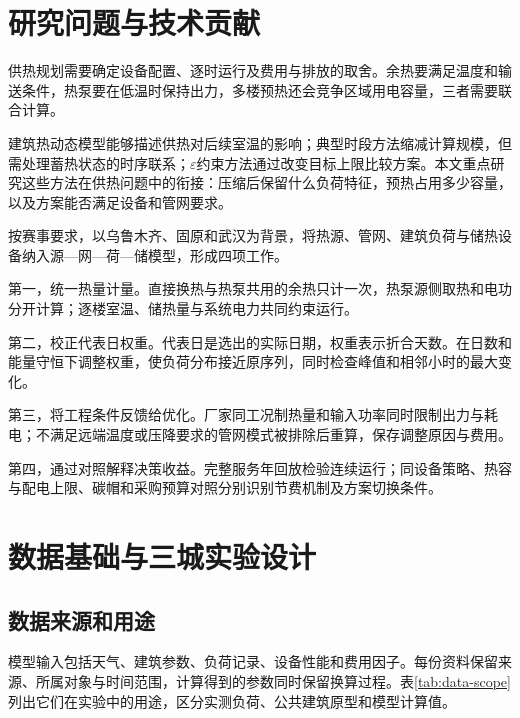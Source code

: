 \section{研究问题与技术贡献}

供热规划需要确定设备配置、逐时运行及费用与排放的取舍。余热要满足温度和输送条件，热泵要在低温时保持出力，多楼预热还会竞争区域用电容量，三者需要联合计算。

建筑热动态模型能够描述供热对后续室温的影响；典型时段方法缩减计算规模，但需处理蓄热状态的时序联系；$\varepsilon$约束方法通过改变目标上限比较方案。本文重点研究这些方法在供热问题中的衔接：压缩后保留什么负荷特征，预热占用多少容量，以及方案能否满足设备和管网要求。

按赛事要求，以乌鲁木齐、固原和武汉为背景，将热源、管网、建筑负荷与储热设备纳入源—网—荷—储模型，形成四项工作。

第一，统一热量计量。直接换热与热泵共用的余热只计一次，热泵源侧取热和电功分开计算；逐楼室温、储热量与系统电力共同约束运行。

第二，校正代表日权重。代表日是选出的实际日期，权重表示折合天数。在日数和能量守恒下调整权重，使负荷分布接近原序列，同时检查峰值和相邻小时的最大变化。

第三，将工程条件反馈给优化。厂家同工况制热量和输入功率同时限制出力与耗电；不满足远端温度或压降要求的管网模式被排除后重算，保存调整原因与费用。

第四，通过对照解释决策收益。完整服务年回放检验连续运行；同设备策略、热容与配电上限、碳帽和采购预算对照分别识别节费机制及方案切换条件。

\section{数据基础与三城实验设计}
\subsection{数据来源和用途}

模型输入包括天气、建筑参数、负荷记录、设备性能和费用因子。每份资料保留来源、所属对象与时间范围，计算得到的参数同时保留换算过程。表\ref{tab:data-scope}列出它们在实验中的用途，区分实测负荷、公共建筑原型和模型计算值。

